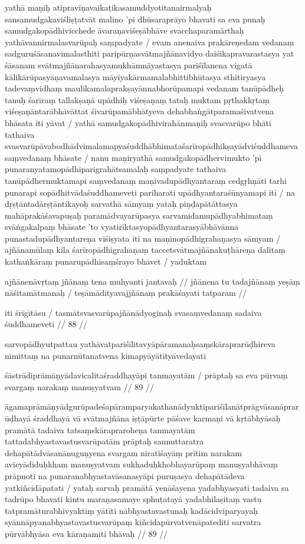 yathā maṇiḥ atipravīṇavaikaṭikasamuddyotitanairmalyaḥ sansamudgakaviśliṣṭatvāt malino 'pi dhūsaraprāyo bhavati sa eva punaḥ samudgakopādhivicchede āvaraṇaviśeṣābhāve svacchaparamārthaḥ yathāvannirmalasvarūpaḥ saṃpadyate  / evam anenaiva prakāreṇedam vedanaṃ sadguruśāsanavimalasthiti paripūrṇasvātmajñānavidyo daiśikapravarastasya yat śāsanam svātmajñānarahasyamukhāmnāyastasya pariśīlanena vigatā kālikārūpasyāṇavamalasya māyīyakārmamalabhittibhūtasya sthitiryasya tadevaṃvidhaṃ maulikamalaprakṣayānnabhorūpamapi vedanam tanūpādheḥ tanuḥ śarīraṃ tallakṣaṇā upādhiḥ viśeṣaṇaṃ tataḥ muktam pṛthakkṛtaṃ viśeṣaṇāntarābhāvāttat śivarūpamābhātyeva dehabhaṅgātparamaśivatvena bhāsata iti yāvat  / yathā samudgakopādhivirahānmaṇiḥ svasvarūpo bhāti tathaiva svasvarūpāvabodhādvimalamapyaśuddhābhimataśarīropādhikṣayādviśuddhameva saṃvedanaṃ bhāsate  / nanu maṇiryathā samudgakopādhervimukto 'pi punaranyatamopādhiparigrahātsamalaḥ saṃpadyate tathaiva tanūpādhermuktamapi saṃvedanaṃ maṇivadupādhyantaraṃ cedgṛhṇāti tarhi punarapi sopādhitvādaśuddhameveti pariharati upādhyantaraśūnyamapi iti  / na dṛṣṭāntadārṣṭāntikayoḥ sarvathā sāmyaṃ yataḥ piṇḍapātāttasya mahāprakāśavapuṣaḥ paramādvayarūpasya sarvamidamupādhyabhimataṃ svāṅgakalpaṃ bhāsate 'to vyatiriktasyopādhyantarasyābhāvānna punastadupādhyantareṇa viśiṣyata iti na maṇinopādhigrahaṇasya sāmyam  / ajñānamūlaṃ kila śarīropādhigrahaṇaṃ taccetsvātmajñānakuṭhāreṇa dalitaṃ kathaṅkāraṃ punarupādhisaṃśrayo bhavet  / yaduktam

ajñānenāvṛtaṃ jñānaṃ tena muhyanti jantavaḥ  //
jñānena tu tadajñānaṃ yeṣāṃ nāśitamātmanaḥ  /
teṣāmādityavajjñānaṃ prakāśayati tatparam  //

iti śrīgītāsu  / tasmātsvasvarūpajñānādyoginaḥ svasaṃvedanaṃ sadaiva śuddhameveti  // 88  //

sarvopādhyutpattau yathāvatpariśīlitavyāpāramanaḥsaṃskāraprarūḍhireva nimittaṃ na punarnūtanatvena kimapyāyātītyāvedayati

śāstrādiprāmāṇyādavicalitaśraddhayāpi tanmayatām  /
prāptaḥ sa eva pūrvaṃ svargaṃ narakaṃ manuṣyatvam  // 89  //

āgamaprāmāṇyādgurūpadeśapāramparyakathanādyuktipariśīlanātprāgvāsanāprarūḍhayā śraddhayā vā svātmajñāna iṣṭāpūrte pāśave karmaṇi vā kṛtābhyāsaḥ pramātā tadaiva tatsaṃskārapraroheṇa tanmayatām tattadabhyastavastusvarūpatām prāptaḥ sannuttaratra dehapātādvāsanānuguṇyena svargam niratiśayāṃ prītim narakam avīcyādiduḥkham manuṣyatvam sukhaduḥkhobhayarūpaṃ manuṣyabhāvaṃ prāpnoti na punaranabhyastavāsanasyāpi puruṣasya dehapātādeva yatkiñcidāpatati  / yataḥ sarvaḥ pramātā yenāśayena yadabhyasyati tadaiva sa tadrūpo bhavati kintu maraṇasamaye sphuṭatayā yadabhilaṣitaṃ vastu tatpramāturabhivyaktiṃ yātīti nābhyastavastunaḥ kadācidviparyayaḥ syānnāpyanabhyastavastusvarūpaṃ kiñcidapūrvatvenāpatediti sarvatra pūrvābhyāsa eva kāraṇamiti bhāvaḥ  // 89  //

